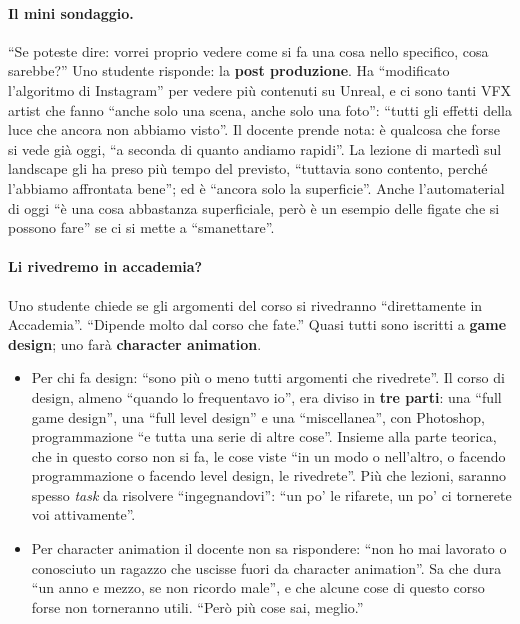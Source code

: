 \paragraph{Il mini sondaggio.} ``Se poteste dire: vorrei proprio vedere come si fa una cosa
nello specifico, cosa sarebbe?'' Uno studente risponde: la \textbf{post produzione}. Ha
``modificato l'algoritmo di Instagram'' per vedere più contenuti su Unreal, e ci sono tanti
VFX artist che fanno ``anche solo una scena, anche solo una foto'': ``tutti gli effetti
della luce che ancora non abbiamo visto''. Il docente prende nota: è qualcosa che forse si
vede già oggi, ``a seconda di quanto andiamo rapidi''. La lezione di martedì sul landscape
gli ha preso più tempo del previsto, ``tuttavia sono contento, perché l'abbiamo affrontata
bene''; ed è ``ancora solo la superficie''. Anche l'automaterial di oggi ``è una cosa
abbastanza superficiale, però è un esempio delle figate che si possono fare'' se ci si mette
a ``smanettare''.

\paragraph{Li rivedremo in accademia?} Uno studente chiede se gli argomenti del corso si
rivedranno ``direttamente in Accademia''. ``Dipende molto dal corso che fate.'' Quasi tutti
sono iscritti a \textbf{game design}; uno farà \textbf{character animation}.
\begin{itemize}
  \item Per chi fa design: ``sono più o meno tutti argomenti che rivedrete''. Il corso di
        design, almeno ``quando lo frequentavo io'', era diviso in \textbf{tre parti}: una
        ``full game design'', una ``full level design'' e una ``miscellanea'', con
        Photoshop, programmazione ``e tutta una serie di altre cose''. Insieme alla parte
        teorica, che in questo corso non si fa, le cose viste ``in un modo o nell'altro, o
        facendo programmazione o facendo level design, le rivedrete''. Più che lezioni,
        saranno spesso \emph{task} da risolvere ``ingegnandovi'': ``un po' le rifarete, un
        po' ci tornerete voi attivamente''.
  \item Per character animation il docente non sa rispondere: ``non ho mai lavorato o
        conosciuto un ragazzo che uscisse fuori da character animation''. Sa che dura ``un
        anno e mezzo, se non ricordo male'', e che alcune cose di questo corso forse non
        torneranno utili. ``Però più cose sai, meglio.''
\end{itemize}


